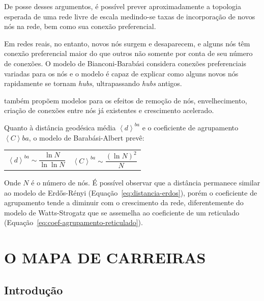 \documentclass[12pt,a4paper]{article}
\theoremstyle{hypo}
\newcommand{\avg}[1]{\left\langle #1 \right\rangle} %
\begin{document}
De posse desses argumentos, é possível prever aproximadamente a topologia esperada de uma rede livre de escala medindo-se taxas de incorporação de novos nós na rede, bem como sua conexão preferencial.

Em redes reais, no entanto, novos nós surgem e desaparecem, e alguns nós têm conexão preferencial maior do que outros não somente por conta de seu número de conexões. O modelo de Bianconi-Barabási considera conexões preferenciais variadas para os nós e o modelo é capaz de explicar como alguns novos nós rapidamente se tornam \textit{hubs}, ultrapassando \textit{hubs} antigos.

 também propõem modelos para os efeitos de remoção de nós, envelhecimento, criação de conexões entre nós já existentes e crescimento acelerado.

Quanto à distância geodésica média $\avg{d}^\textit{ba}$ e o coeficiente de agrupamento $\avg{C}\textit{ba}$, o modelo de Barabási-Albert prevê:

\noindent
\begin{tabularx}{\linewidth}{@{}XX@{}}
    \begin{equation} \label{eq:distancia-barabasi-albert}
    \avg{d}^\textit{ba} \sim \frac{\ln N}{\ln \ln N}
    \end{equation} &
    \begin{equation} \label{eq:coef-agrupamento-barabasi-albert}
    \avg{C}^\textit{ba} \sim \frac{(\ln N)^2}{N}
    \end{equation}
\end{tabularx}

Onde $N$ é o número de nós. É possível observar que a distância permanece similar ao modelo de Erdős-Rényi (Equação~\ref{eq:distancia-erdos}), porém o coeficiente de agrupamento tende a diminuir com o crescimento da rede, diferentemente do modelo de Watts-Strogatz que se assemelha ao coeficiente de um reticulado (Equação~\ref{eq:coef-agrupamento-reticulado}).


\section{O MAPA DE CARREIRAS}

\subsection{Introdução}
\end{document}
